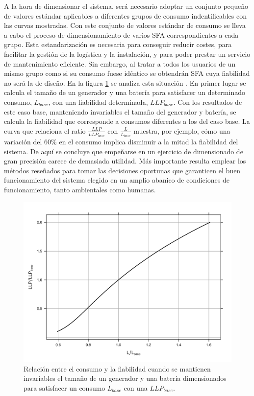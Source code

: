 A la hora de dimensionar el sistema, será necesario adoptar un conjunto
pequeño de valores estándar aplicables a diferentes grupos de consumo
indentificables con las curvas mostradas. Con este conjunto de valores
estándar de consumo se lleva a cabo el proceso de dimensionamiento
de varios SFA correspondientes a cada grupo. Esta estandarización
es necesaria para conseguir reducir costes, para facilitar la gestión
de la logística y la instalación, y para poder prestar un servicio
de mantenimiento eficiente. Sin embargo, al tratar a todos los usuarios
de un mismo grupo como si su consumo fuese idéntico se obtendrán SFA
cuya fiabilidad no será la de diseño. En la figura \ref{fig:ConsumoLLP}
se analiza esta situación \cite{Lorenzo.Narvarte2000}. En primer
lugar se calcula el tamaño de un generador y una batería para satisfacer
un determinado consumo, $L_{base}$, con una fiabilidad determinada,
$LLP_{base}$. Con los resultados de este caso base, manteniendo invariables
el tamaño del generador y batería, se calcula la fiabilidad que corresponde
a consumos diferentes a los del caso base. La curva que relaciona
el ratio $\frac{LLP}{LLP_{base}}$ con $\frac{L}{L_{base}}$
muestra, por ejemplo, cómo una variación del 60\% en el consumo implica
disminuir a la mitad la fiabilidad del sistema. De aquí se concluye
que empeñarse en un ejercicio de dimensionado de gran precisión carece
de demasiada utilidad. Más importante resulta emplear los métodos
reseñados para tomar las decisiones oportunas que garanticen el buen
funcionamiento del sistema elegido en un amplio abanico de condiciones
de funcionamiento, tanto ambientales como humanas.

%
\begin{figure}
\includegraphics[scale=0.6]{../figs/ConsumoLLP}

\caption{Relación entre el consumo y la fiabilidad cuando se mantienen invariables
el tamaño de un generador y una batería dimensionados para satisfacer
un consumo $L_{base}$ con una $LLP_{base}$.\label{fig:ConsumoLLP}}



\end{figure}


